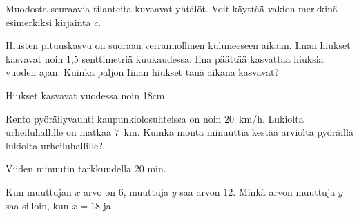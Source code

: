 \begin{tehtavasivu}
\begin{tehtava}
Muodosta seuraavia tilanteita kuvaavat yhtälöt. Voit käyttää vakion merkkinä esimerkiksi kirjainta $c$. %
\begin{alakohdat}
\end{alakohdat}
\begin{vastaus}
\begin{alakohdat}
\end{alakohdat}
\end{vastaus}
\end{tehtava}

\begin{tehtava}
Hiusten pituuskasvu on suoraan verrannollinen kuluneeseen aikaan. Iinan hiukset kasvavat noin 1,5 senttimetriä kuukaudessa. Iina päättää kasvattaa hiuksia vuoden ajan. Kuinka paljon Iinan hiukset tänä aikana kasvavat?
\begin{vastaus}
Hiukset kasvavat vuodessa noin 18cm.
\end{vastaus}
\end{tehtava}

\begin{tehtava}
Rento pyöräilyvauhti kaupunkiolosuhteissa on noin $20$~km/h. Lukiolta urheiluhallille on matkaa $7$~km. Kuinka monta minuuttia kestää arviolta pyöräillä lukiolta urheiluhallille?
\begin{vastaus}
Viiden minuutin tarkkuudella $20$ min.
\end{vastaus}
\end{tehtava}

\begin{tehtava}
Kun muuttujan $ x $ arvo on $ 6 $, muuttuja $ y $ saa arvon $ 12 $. Minkä arvon muuttuja $ y $ saa silloin, kun $ x=18 $ ja
	\begin{alakohdat}
\end{alakohdat} 
	\begin{vastaus}
		\begin{alakohdat}
\end{alakohdat} 
	\end{vastaus}
\end{tehtava}


\end{tehtavasivu}
